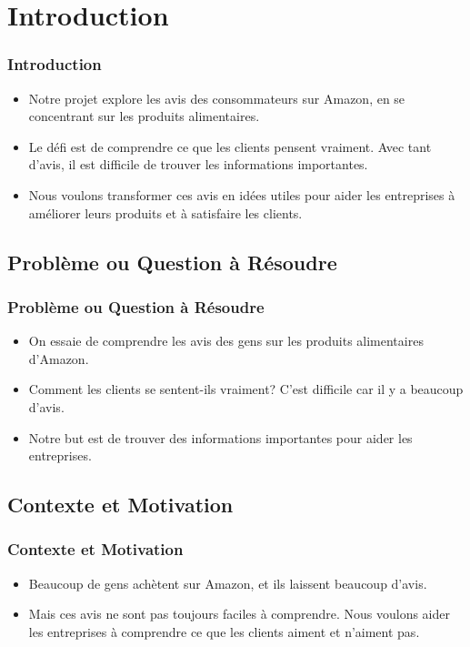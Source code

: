 \section{Introduction}

\begin{frame}
    \frametitle{Introduction}

    \begin{itemize}
        \item Notre projet explore les avis des consommateurs sur Amazon, en se concentrant sur les produits alimentaires.
        \item Le défi est de comprendre ce que les clients pensent vraiment. Avec tant d'avis, il est difficile de trouver les informations importantes.
        \item Nous voulons transformer ces avis en idées utiles pour aider les entreprises à améliorer leurs produits et à satisfaire les clients.
    \end{itemize}
\end{frame}

\subsection{Problème ou Question à Résoudre}

\begin{frame}
    \frametitle{Problème ou Question à Résoudre}

    \begin{itemize}
        \item On essaie de comprendre les avis des gens sur les produits alimentaires d'Amazon.
        \item Comment les clients se sentent-ils vraiment? C'est difficile car il y a beaucoup d'avis.
        \item Notre but est de trouver des informations importantes pour aider les entreprises.
    \end{itemize}
\end{frame}

\subsection{Contexte et Motivation}

\begin{frame}
    \frametitle{Contexte et Motivation}

    \begin{itemize}
        \item Beaucoup de gens achètent sur Amazon, et ils laissent beaucoup d'avis.
        \item Mais ces avis ne sont pas toujours faciles à comprendre. Nous voulons aider les entreprises à comprendre ce que les clients aiment et n'aiment pas.
    \end{itemize}
\end{frame}

